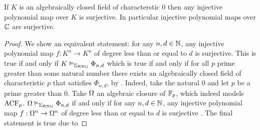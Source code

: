 \begin{prop}[Ax-Grothendieck]
    If $K$ is an algebraically closed field of characterstic $0$
    then any injective polynomial map over $K$ is surjective.
    In particular injective polynomial maps over $\mathbb{C}$ are surjective.
\end{prop}
\begin{proof}
    We show an equivalent statement:
    for any $n, d \in \mathbb{N}$, any injective polynomial map $f : K^n \to K^n$ 
    of degree less than or equal to $d$ is surjective.
    This is true if and only if $K \vDash_{\Sigma_{\mathrm{RNG}}} \Phi_{n,d}$
    which is true if and only if 
    for all $p$ prime greater than some natural number there exists 
    an algebraically closed field of characteristic $p$ that satisfies 
    $\Phi_{n,d}$, by .
    Indeed, take the natural $0$ and let $p$ be a prime greater than $0$.
    Take $\Omega$ an algebraic closure of $\mathbb{F}_p$, 
    which indeed models $\operatorname{ACF}_p$.
    $\Omega \vDash_{\Sigma_{\mathrm{RNG}}} \Phi_{n,d}$ if and only if 
    for any $n, d \in \mathbb{N}$, any injective polynomial map $f : \Omega^n \to \Omega^n$ 
    of degree less than or equal to $d$ is surjective  
    .
    The final statement is true due to 
\end{proof}


